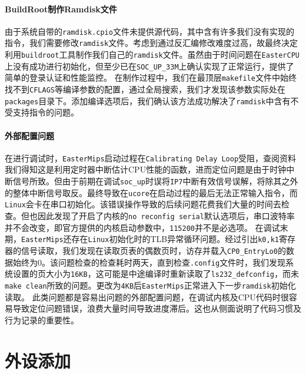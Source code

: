\hypertarget{buildrootux5236ux4f5cramdiskux6587ux4ef6}{%
\paragraph{BuildRoot制作Ramdisk文件}\label{buildrootux5236ux4f5cramdiskux6587ux4ef6}}

由于系统自带的\texttt{ramdisk.cpio}文件未提供源代码，其中含有许多我们没有实现的指令，我们需要修改\texttt{ramdisk}文件。考虑到通过反汇编修改难度过高，故最终决定利用\texttt{buildroot}工具制作我们自己的\texttt{ramdisk}文件。虽然由于时间问题在\texttt{EasterCPU}上没有成功进行初始化，但至少已在\texttt{SOC\_UP\_33M}上确认实现了正常运行，提供了简单的登录认证和性能监控。
在制作过程中，我们在最顶层\texttt{makefile}文件中始终找不到\texttt{CFLAGS}等编译参数的配置，通过全局搜索，我们才发现该参数实际处在\texttt{packages}目录下。添加编译选项后，我们确认该方法成功解决了\texttt{ramdisk}中含有不受支持指令的问题。

\hypertarget{ux5916ux90e8ux914dux7f6eux95eeux9898}{%
\paragraph{外部配置问题}\label{ux5916ux90e8ux914dux7f6eux95eeux9898}}

在进行调试时，\texttt{EasterMips}启动过程在\texttt{Calibrating\ Delay\ Loop}受阻，查阅资料我们得知这是利用定时器中断估计CPU性能的函数，进而定位问题是由于时钟中断信号所致。但由于前期在调试\texttt{soc\_up}时误将\texttt{IP7}中断有效信号误解，将除其之外的整体中断信号取反。最终导致在\texttt{ucore}在启动过程的最后无法正常输入指令，而\texttt{Linux}会卡在串口初始化。该错误操作导致的后续问题花费我们大量的时间去检查。但也因此发现了开启了内核的\texttt{no\ reconfig\ serial}默认选项后，串口波特率并不会改变，即官方提供的内核启动参数中，\texttt{115200}并不是必选项。
在调试末期，\texttt{EasterMips}还存在\texttt{Linux}初始化时的TLB异常循环问题。经过引出\texttt{k0,k1}寄存器的信号读取，我们发现在读取页表的偶数页时，访存并载入\texttt{CP0\_EntryLo0}的数据始终为0。该问题检查的检查耗时两天，直到检查\texttt{.config}文件时，我们发现系统设置的页大小为\texttt{16KB}，这可能是中途编译时重新读取了\texttt{ls232\_defconfig}，而未\texttt{make\ clean}所致的问题。更改为\texttt{4KB}后\texttt{EasterMips}正常进入下一步\texttt{ramdisk}初始化读取。
此类问题都是容易出问题的外部配置问题，在调试内核及CPU代码时很容易导致定位问题错误，浪费大量时间导致进度滞后。这也从侧面说明了代码习惯及行为记录的重要性。

\hypertarget{ux5916ux8bbeux6dfbux52a0}{%
\section{外设添加}\label{ux5916ux8bbeux6dfbux52a0}}

